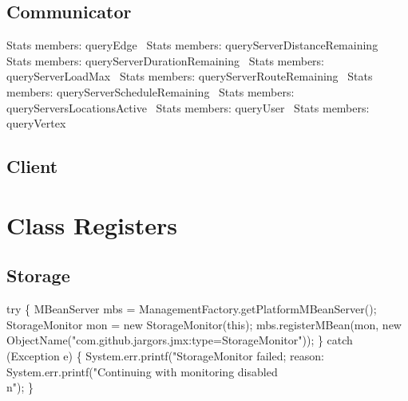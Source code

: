 \subsection{Communicator}
\nwenddocs{}\endmoddef{}
\LA{}Stats members: queryEdge~{\nwtagstyle{}}\RA{}
\LA{}Stats members: queryServerDistanceRemaining~{\nwtagstyle{}}\RA{}
\LA{}Stats members: queryServerDurationRemaining~{\nwtagstyle{}}\RA{}
\LA{}Stats members: queryServerLoadMax~{\nwtagstyle{}}\RA{}
\LA{}Stats members: queryServerRouteRemaining~{\nwtagstyle{}}\RA{}
\LA{}Stats members: queryServerScheduleRemaining~{\nwtagstyle{}}\RA{}
\LA{}Stats members: queryServersLocationsActive~{\nwtagstyle{}}\RA{}
\LA{}Stats members: queryUser~{\nwtagstyle{}}\RA{}
\LA{}Stats members: queryVertex~{\nwtagstyle{}}\RA{}
\nwendcode{}\nwdocspar

\subsection{Client}
\nwenddocs{}\endmoddef{}
\nwendcode{}\nwdocspar

\section{Class Registers}
\subsection{Storage}
\nwenddocs{}\endmoddef{}
try \{
  MBeanServer mbs = ManagementFactory.getPlatformMBeanServer();
  StorageMonitor mon = new StorageMonitor(this);
  mbs.registerMBean(mon, new ObjectName("com.github.jargors.jmx:type=StorageMonitor"));
\} catch (Exception e) \{
  System.err.printf("StorageMonitor failed; reason: %
  System.err.printf("Continuing with monitoring disabled\\n");
\}
\nwendcode{}\nwdocspar

